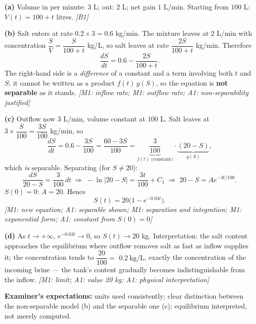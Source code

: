 \documentclass[11pt]{article}
\begin{document}
\begin{corrige}
\textbf{(a)} Volume in per minute: $3$ L; out: $2$ L; net gain $1$ L/min. Starting from $100$ L: $V(t)=100+t$ litres. \hfill \emph{[B1]}

\textbf{(b)} Salt enters at rate $0.2\times 3=0.6$ kg/min. The mixture leaves at $2$ L/min with concentration $\dfrac{S}{V}=\dfrac{S}{100+t}$ kg/L, so salt leaves at rate $\dfrac{2S}{100+t}$ kg/min. Therefore
\[ \frac{dS}{dt}=0.6-\frac{2S}{100+t}. \]
The right-hand side is a \emph{difference} of a constant and a term involving both $t$ and $S$; it cannot be written as a product $f(t)\,g(S)$, so the equation is \textbf{not separable} as it stands. \hfill \emph{[M1: inflow rate; M1: outflow rate; A1: non-separability justified]}

\textbf{(c)} Outflow now $3$ L/min, volume constant at $100$ L. Salt leaves at $3\times\dfrac{S}{100}=\dfrac{3S}{100}$ kg/min, so
\[ \frac{dS}{dt}=0.6-\frac{3S}{100}=\frac{60-3S}{100}=\underbrace{\frac{3}{100}}_{f(t)\text{ (constant)}}\cdot\underbrace{(20-S)}_{g(S)}, \]
which \emph{is} separable. Separating (for $S\neq 20$):
\[ \frac{dS}{20-S}=\frac{3}{100}\,dt \;\Longrightarrow\; -\ln|20-S|=\frac{3t}{100}+C_1 \;\Longrightarrow\; 20-S=Ae^{-3t/100}. \]
$S(0)=0$: $A=20$. Hence
\[ \boxed{S(t)=20\bigl(1-e^{-0.03t}\bigr)}. \]
\emph{[M1: new equation; A1: separable shown; M1: separation and integration; M1: exponential form; A1: constant from $S(0)=0$]}

\textbf{(d)} As $t\to+\infty$, $e^{-0.03t}\to 0$, so $S(t)\to 20$ kg. Interpretation: the salt content approaches the equilibrium where outflow removes salt as fast as inflow supplies it; the concentration tends to $\dfrac{20}{100}=$ $0.2\ \mathrm{kg/L}$, exactly the concentration of the incoming brine — the tank's content gradually becomes indistinguishable from the inflow. \hfill \emph{[M1: limit; A1: value 20 kg; A1: physical interpretation]}

\textbf{Examiner's expectations:} units used consistently; clear distinction between the non-separable model (b) and the separable one (c); equilibrium interpreted, not merely computed.
\end{corrige}
\end{document}
